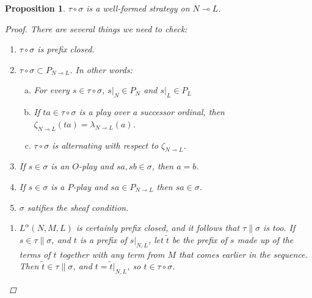 \documentclass[11pt]{article} %
\theoremstyle{plain} %
\newtheorem{proposition}[theorem]{Proposition}
\theoremstyle{definition} %
\theoremstyle{exercisestyle}
\renewcommand{\implies}{\multimap}
\newcommand{\comp}[2]{#1 \circ #2}
\begin{document}
\begin{proposition}
  $\comp\tau\sigma$ is a well-formed strategy on $N\implies L$.
  \begin{proof}
    There are several things we need to check:
    \begin{enumerate}[1)]
      \item $\comp\tau\sigma$ is prefix closed.
      \item $\comp\tau\sigma\subset P_{N\implies L}$.  In other words:
        \begin{enumerate}[a)]
          \item For every $s\in\comp\tau\sigma$, $s\vert_N\in P_N$ and $s\vert_L\in P_L$
          \item If $ta\in\comp\tau\sigma$ is a play over a successor ordinal, then $\zeta_{N\implies L}(ta)=\lambda_{N\implies L}(a)$.
          \item $\comp\tau\sigma$ is alternating with respect to $\zeta_{N\implies L}$.
        \end{enumerate}
      \item If $s\in\sigma$ is an $O$-play and $sa,sb\in\sigma$, then $a=b$.
      \item If $s\in\sigma$ is a $P$-play and $sa\in P_{N\implies L}$ then $sa\in\sigma$.
      \item $\sigma$ satifies the sheaf condition.
    \end{enumerate}

    \begin{enumerate}[(1): ]
      \item $L^\alpha(N,M,L)$ is certainly prefix closed, and it follows that $\tau\|\sigma$ is too.  If $s\in\tau\|\sigma$, and $t$ is a prefix of $s\vert_{N,L}$, let $\tilde{t}$ be the prefix of $s$ made up of the terms of $t$ together with any term from $M$ that comes earlier in the sequence.  Then $\tilde{t}\in\tau\|\sigma$, and $t=\tilde{t}\vert_{N,L}$, so $t\in\comp\tau\sigma$.


\end{enumerate}
\end{proof}
\end{proposition}
\end{document}
